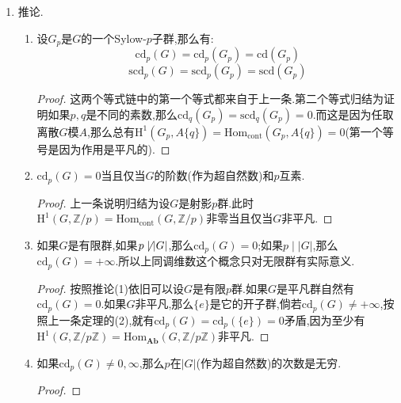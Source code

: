 \begin{enumerate}
\begin{proof}
		我们来证明上同调维数的情况,严格上同调维数的情况是类似的.这个不等式就是因为当$A$是离散$H$模/$p$准素时$\mathrm{coInd}_G^H(A)$是离散$G$模/$p$准素,以及Shapiro引理$\mathrm{H}^q(G,\mathrm{coInd}_G^H(A))=\mathrm{H}^q(H,A)$.如果$p$不整除$[G:H]$,那么上一条引理的(1)就保证该不等式取等.
		
		\qquad
		
		如果$H\le G$是开子群,并且$\mathrm{cd}_p(G)=n$是有限数.不妨设$n\ge1$,那么存在某个扭离散$G$模$A$使得$\mathrm{H}^n(G,A)\{p\}\not=0$.于是上一条引理的(2)就保证$\mathrm{H}^n(H,A)\{p\}\not=0$,于是该不等式取等.
	\end{proof}
	\item 推论.
	\begin{enumerate}[(1)]
		\item 设$G_p$是$G$的一个Sylow-$p$子群,那么有:
		$$\mathrm{cd}_p(G)=\mathrm{cd}_p(G_p)=\mathrm{cd}(G_p)$$
		$$\mathrm{scd}_p(G)=\mathrm{scd}_p(G_p)=\mathrm{scd}(G_p)$$
		\begin{proof}
			
			这两个等式链中的第一个等式都来自于上一条.第二个等式归结为证明如果$p,q$是不同的素数,那么$\mathrm{cd}_q(G_p)=\mathrm{scd}_q(G_p)=0$.而这是因为任取离散$G$模$A$,那么总有$\mathrm{H}^1(G_p,A\{q\})=\mathrm{Hom}_{\mathrm{cont}}(G_p,A\{q\})=0$(第一个等号是因为作用是平凡的).
		\end{proof}
		\item $\mathrm{cd}_p(G)=0$当且仅当$G$的阶数(作为超自然数)和$p$互素.
		\begin{proof}
			
			上一条说明归结为设$G$是射影$p$群.此时$\mathrm{H}^1(G,\mathbb{Z}/p)=\mathrm{Hom}_{\mathrm{cont}}(G,\mathbb{Z}/p)$非零当且仅当$G$非平凡.
		\end{proof}
		\item 如果$G$是有限群,如果$p\not\mid|G|$,那么$\mathrm{cd}_p(G)=0$;如果$p\mid|G|$,那么$\mathrm{cd}_p(G)=+\infty$.所以上同调维数这个概念只对无限群有实际意义.
		\begin{proof}
			
			按照推论(1)依旧可以设$G$是有限$p$群.如果$G$是平凡群自然有$\mathrm{cd}_p(G)=0$.如果$G$非平凡,那么$\{e\}$是它的开子群,倘若$\mathrm{cd}_p(G)\not=+\infty$,按照上一条定理的(2),就有$\mathrm{cd}_p(G)=\mathrm{cd}_p(\{e\})=0$矛盾,因为至少有$\mathrm{H}^1(G,\mathbb{Z}/p\mathbb{Z})=\mathrm{Hom}_{\textbf{Ab}}(G,\mathbb{Z}/p\mathbb{Z})$非平凡.
		\end{proof}
		\item 如果$\mathrm{cd}_p(G)\not=0,\infty$,那么$p$在$|G|$(作为超自然数)的次数是无穷.
		\begin{proof}
			

\end{proof}
\end{enumerate}
\end{enumerate}
